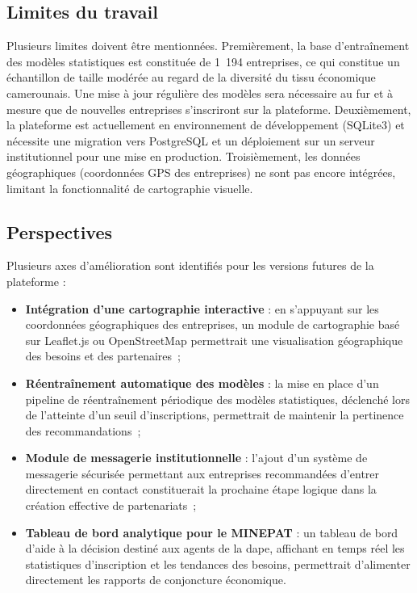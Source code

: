 \documentclass[12pt, a4paper, oneside]{report}
\begin{document}
\subsection{Limites du travail}

Plusieurs limites doivent être mentionnées. Premièrement, la base d'entraînement des modèles statistiques est constituée de 1~194 entreprises, ce qui constitue un échantillon de taille modérée au regard de la diversité du tissu économique camerounais. Une mise à jour régulière des modèles sera nécessaire au fur et à mesure que de nouvelles entreprises s'inscriront sur la plateforme. Deuxièmement, la plateforme est actuellement en environnement de développement (SQLite3) et nécessite une migration vers PostgreSQL et un déploiement sur un serveur institutionnel pour une mise en production. Troisièmement, les données géographiques (coordonnées GPS des entreprises) ne sont pas encore intégrées, limitant la fonctionnalité de cartographie visuelle.

\subsection{Perspectives}

Plusieurs axes d'amélioration sont identifiés pour les versions futures de la plateforme :

\begin{itemize}
  \item \textbf{Intégration d'une cartographie interactive} : en s'appuyant sur les coordonnées géographiques des entreprises, un module de cartographie basé sur Leaflet.js ou OpenStreetMap permettrait une visualisation géographique des besoins et des partenaires~;

  \item \textbf{Réentraînement automatique des modèles} : la mise en place d'un pipeline de réentraînement périodique des modèles statistiques, déclenché lors de l'atteinte d'un seuil d'inscriptions, permettrait de maintenir la pertinence des recommandations~;

  \item \textbf{Module de messagerie institutionnelle} : l'ajout d'un système de messagerie sécurisée permettant aux entreprises recommandées d'entrer directement en contact constituerait la prochaine étape logique dans la création effective de partenariats~;

  \item \textbf{Tableau de bord analytique pour le MINEPAT} : un tableau de bord d'aide à la décision destiné aux agents de la \gls{dape}, affichant en temps réel les statistiques d'inscription et les tendances des besoins, permettrait d'alimenter directement les rapports de conjoncture économique.
\end{itemize}
\end{document}
